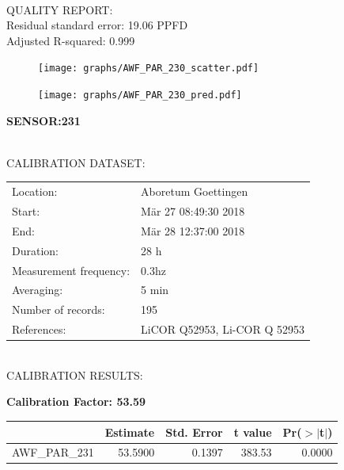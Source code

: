 \documentclass[oneside]{report}
\begin{document}
\hrulefill\\
QUALITY REPORT:\\
Residual standard error: 19.06 PPFD\\
Adjusted R-squared: 0.999



\begin{figure}[H]
  \centering
  \texttt{[image: graphs/AWF\_PAR\_230\_scatter.pdf]}
\end{figure}




\begin{figure}[H]
  \centering
  \texttt{[image: graphs/AWF\_PAR\_230\_pred.pdf]}
\end{figure}

\pagebreak


\begin{center}
\large{\textbf{SENSOR:231}}\\
\end{center}

\hrulefill\\
CALIBRATION DATASET:\\
\begin{table}[h!]
  \centering
  \label{tab:table1}
  \begin{tabular}{ll}
    Location: & Aboretum Goettingen\\ 
    
    
    Start:  & Mär 27 08:49:30 2018 \\
    End:   & Mär 28 12:37:00 2018\\ 
    Duration: & 28 h\\
    Measurement frequency: & 0.3hz\\
    Averaging:  &5 min\\
    Number of records: & 195 \\
    References: & LiCOR Q52953, Li-COR Q 52953 \\
  \end{tabular}
\end{table}

\hrulefill\\
CALIBRATION RESULTS:\\


\begin{center}
\textbf{\large{Calibration Factor: 53.59}}\\
\end{center}
\begin{table}[ht]
\centering
\begin{tabular}{rrrrr}
  \hline
 & Estimate & Std. Error & t value & Pr($>$$|$t$|$) \\ 
  \hline
AWF\_PAR\_231 & 53.5900 & 0.1397 & 383.53 & 0.0000 \\ 
   \hline
\end{tabular}
\end{table}
\end{document}
